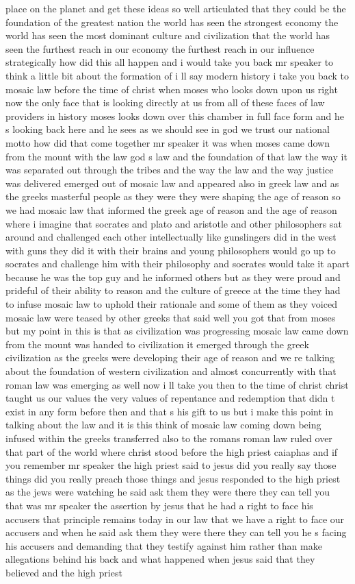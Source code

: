 \documentclass{article}
\begin{document}
place on the planet and get these ideas so well articulated that they could be the foundation of the greatest nation the world has seen the strongest economy the world has seen the most dominant culture and civilization that the world has seen the furthest reach in our economy the furthest reach in our influence strategically how did this all happen and i would take you back mr speaker to think a little bit about the formation of i ll say modern history i take you back to mosaic law before the time of christ when moses who looks down upon us right now the only face that is looking directly at us from all of these faces of law providers in history moses looks down over this chamber in full face form and he s looking back here and he sees as we should see in god we trust our national motto how did that come together mr speaker it was when moses came down from the mount with the law god s law and the foundation of that law the way it was separated out through the tribes and the way the law and the way justice was delivered emerged out of mosaic law and appeared also in greek law and as the greeks masterful people as they were they were shaping the age of reason so we had mosaic law that informed the greek age of reason and the age of reason where i imagine that socrates and plato and aristotle and other philosophers sat around and challenged each other intellectually like gunslingers did in the west with guns they did it with their brains and young philosophers would go up to socrates and challenge him with their philosophy and socrates would take it apart because he was the top guy and he informed others but as they were proud and prideful of their ability to reason and the culture of greece at the time they had to infuse mosaic law to uphold their rationale and some of them as they voiced mosaic law were teased by other greeks that said well you got that from moses but my point in this is that as civilization was progressing mosaic law came down from the mount was handed to civilization it emerged through the greek civilization as the greeks were developing their age of reason and we re talking about the foundation of western civilization and almost concurrently with that roman law was emerging as well now i ll take you then to the time of christ christ taught us our values the very values of repentance and redemption that didn t exist in any form before then and that s his gift to us but i make this point in talking about the law and it is this think of mosaic law coming down being infused within the greeks transferred also to the romans roman law ruled over that part of the world where christ stood before the high priest caiaphas and if you remember mr speaker the high priest said to jesus did you really say those things did you really preach those things and jesus responded to the high priest as the jews were watching he said ask them they were there they can tell you that was mr speaker the assertion by jesus that he had a right to face his accusers that principle remains today in our law that we have a right to face our accusers and when he said ask them they were there they can tell you he s facing his accusers and demanding that they testify against him rather than make allegations behind his back and what happened when jesus said that they believed and the high priest 
\end{document}
